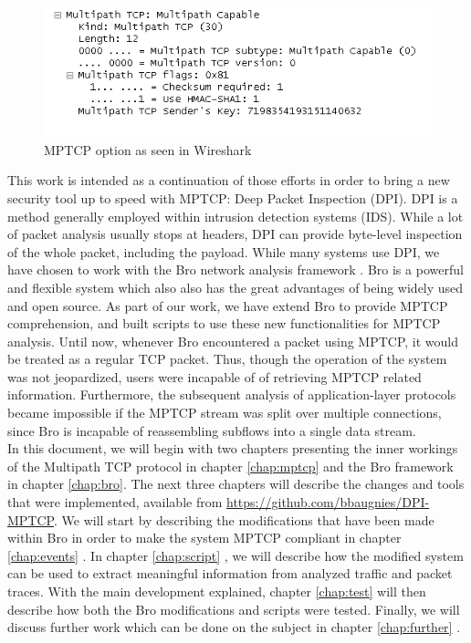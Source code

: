 \begin{figure}[!t]
\centering
\includegraphics[width=\columnwidth]{Figures/wiresharkdemo.png}
\caption{MPTCP option as seen in Wireshark}
\label{pic:wshark demo}
\end{figure}

This work is intended as a continuation of those efforts in order to bring a new security tool up to speed with MPTCP: Deep Packet Inspection (DPI). DPI is a method generally employed within intrusion detection systems (IDS). While a lot of packet analysis usually stops at headers, DPI can provide byte-level inspection of the whole packet, including the payload. While many systems use DPI, we have chosen to work with the Bro network analysis framework \cite{bro} . Bro is a powerful and flexible system which also also has the great advantages of being widely used and open source. As part of our work, we have extend Bro to provide MPTCP comprehension, and built scripts to use these new functionalities for MPTCP analysis. Until now, whenever Bro encountered a packet using MPTCP, it would be treated as a regular TCP packet. Thus, though the operation of the system was not jeopardized, users were incapable of of retrieving MPTCP related information. Furthermore, the subsequent analysis of application-layer protocols became impossible if the MPTCP stream was split over multiple connections, since Bro is incapable of reassembling subflows into a single data stream. \\

In this document, we will begin with two chapters presenting the inner workings of the Multipath TCP protocol in chapter \ref{chap:mptcp} and the Bro framework in chapter \ref{chap:bro}. The next three chapters will describe the changes and tools that were implemented, available from \url{https://github.com/bbaugnies/DPI-MPTCP}. We will start by describing the modifications that have been made within Bro in order to make the system MPTCP compliant in chapter \ref{chap:events} . In chapter \ref{chap:script} , we will describe how the modified system can be used to extract meaningful information from analyzed traffic and packet traces. With the main development explained, chapter \ref{chap:test} will then describe how both the Bro modifications and scripts were tested. Finally, we will discuss further work which can be done on the subject in chapter \ref{chap:further} .